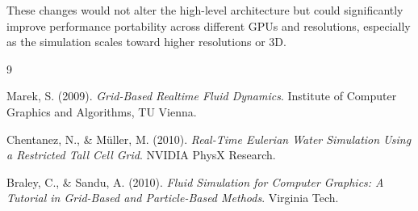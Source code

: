 \documentclass[12pt,a4paper]{article}
\begin{document}
These changes would not alter the high-level architecture but could significantly improve performance portability across different GPUs and resolutions, especially as the simulation scales toward higher resolutions or 3D.

\begin{thebibliography}{9}

 Marek, S. (2009). \textit{Grid-Based Realtime Fluid Dynamics}. Institute of Computer Graphics and Algorithms, TU Vienna.

 Chentanez, N., \& Müller, M. (2010). \textit{Real-Time Eulerian Water Simulation Using a Restricted Tall Cell Grid}. NVIDIA PhysX Research.

 Braley, C., \& Sandu, A. (2010). \textit{Fluid Simulation for Computer Graphics: A Tutorial in Grid-Based and Particle-Based Methods}. Virginia Tech.

\end{thebibliography}
\end{document}
